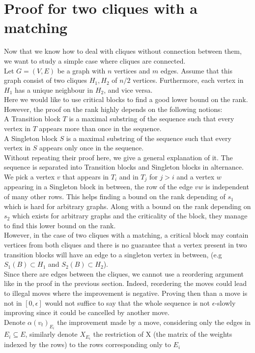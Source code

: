\section{Proof for two cliques with a matching}
Now that we know how to deal with cliques without connection between them, we want to study a simple case where cliques are connected. \\
Let $G = (V,E)$ be a graph with $n$ vertices and $m$ edges. Assume that this graph consist of two cliques $H_1, H_2$ of $n/2$ vertices. Furthermore, each vertex in $H_1$ has a unique neighbour in $H_2$, and vice versa. \\
Here we would like to use critical blocks to find a good lower bound on the rank. However, the proof on the rank \cite{angel2016local} highly depends on the following notions:\\
A Transition block $T$ is a maximal substring of the sequence such that every vertex in $T$ appears more than once in the sequence. \\
A Singleton block $S$ is a maximal substring of the sequence  such that every vertex in $S$ appears only once in the sequence. \\
Without repeating their proof here, we give a general explanation of it. The sequence is separated into Transition blocks and Singleton blocks in alternance. We pick a vertex $v$ that appears in $T_i$ and in $T_j$ for $ j > i$ and a vertex $w$ appearing in a Singleton block in between, the row of the edge $vw$ is independent of many other rows. This helps finding a bound on the rank depending of $s_1$ which is hard for arbitrary graphs. Along with a bound on the rank depending on $s_2$ which exists for arbitrary graphs and the criticality of the block, they manage to find this lower bound on the rank.\\
However, in the case of two cliques with a matching, a critical block may contain vertices from both cliques and there is no guarantee that a vertex present in two transition blocks will have an edge to a singleton vertex in between, (e.g $S_1(B) \subset H_1$ and $S_2(B) \subset H_2$).\\ 
Since there are edges between the cliques, we cannot use a reordering argument like in the proof in the previous section. Indeed, reordering the moves could lead to illegal moves where the improvement is negative. Proving then than a move is not in $[0, \epsilon]$ would not suffice to say that the whole sequence is not $\epsilon$-slowly improving since it could be cancelled by another move.\\
Denote $\alpha(v_t)_{E_i}$ the improvement made by a move, considering only the edges in $E_i \subseteq E$, similarly denote $X_{E_i}$ the restriction of X (the matrix of the weights indexed by the rows) to the rows corresponding only to $E_i$ 

